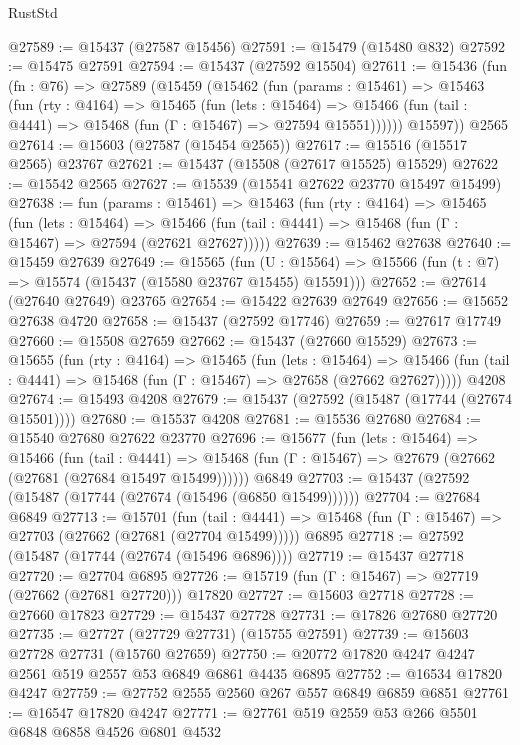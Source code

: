 \begin{lexlean}{RustStd}
\begin{coremodule}
@27589 := @15437 (@27587 @15456)
@27591 := @15479 (@15480 @832)
@27592 := @15475 @27591
@27594 := @15437 (@27592 @15504)
@27611 := @15436
    (fun (fn : @76) =>
    @27589
      (@15459
        (@15462
          (fun (params : @15461) =>
          @15463
            (fun (rty : @4164) =>
            @15465
              (fun (lets : @15464) =>
              @15466 (fun (tail : @4441) => @15468 (fun (Γ : @15467) => @27594 @15551))))))
        @15597))
    @2565
@27614 := @15603 (@27587 (@15454 @2565))
@27617 := @15516 (@15517 @2565) @23767
@27621 := @15437 (@15508 (@27617 @15525) @15529)
@27622 := @15542 @2565
@27627 := @15539 (@15541 @27622 @23770 @15497 @15499)
@27638 := fun (params : @15461) =>
  @15463
    (fun (rty : @4164) =>
    @15465
      (fun (lets : @15464) =>
      @15466 (fun (tail : @4441) => @15468 (fun (Γ : @15467) => @27594 (@27621 @27627)))))
@27639 := @15462 @27638
@27640 := @15459 @27639
@27649 := @15565
    (fun (U : @15564) => @15566 (fun (t : @7) => @15574 (@15437 (@15580 @23767 @15455) @15591)))
@27652 := @27614 (@27640 @27649) @23765
@27654 := @15422 @27639 @27649
@27656 := @15652 @27638 @4720
@27658 := @15437 (@27592 @17746)
@27659 := @27617 @17749
@27660 := @15508 @27659
@27662 := @15437 (@27660 @15529)
@27673 := @15655
    (fun (rty : @4164) =>
    @15465
      (fun (lets : @15464) =>
      @15466 (fun (tail : @4441) => @15468 (fun (Γ : @15467) => @27658 (@27662 @27627)))))
    @4208
@27674 := @15493 @4208
@27679 := @15437 (@27592 (@15487 (@17744 (@27674 @15501))))
@27680 := @15537 @4208
@27681 := @15536 @27680
@27684 := @15540 @27680 @27622 @23770
@27696 := @15677
    (fun (lets : @15464) =>
    @15466
      (fun (tail : @4441) =>
      @15468 (fun (Γ : @15467) => @27679 (@27662 (@27681 (@27684 @15497 @15499))))))
    @6849
@27703 := @15437 (@27592 (@15487 (@17744 (@27674 (@15496 (@6850 @15499))))))
@27704 := @27684 @6849
@27713 := @15701
    (fun (tail : @4441) => @15468 (fun (Γ : @15467) => @27703 (@27662 (@27681 (@27704 @15499)))))
    @6895
@27718 := @27592 (@15487 (@17744 (@27674 (@15496 @6896))))
@27719 := @15437 @27718
@27720 := @27704 @6895
@27726 := @15719 (fun (Γ : @15467) => @27719 (@27662 (@27681 @27720))) @17820
@27727 := @15603 @27718
@27728 := @27660 @17823
@27729 := @15437 @27728
@27731 := @17826 @27680 @27720
@27735 := @27727 (@27729 @27731) (@15755 @27591)
@27739 := @15603 @27728 @27731 (@15760 @27659)
@27750 := @20772 @17820 @4247 @4247 @2561 @519 @2557 @53 @6849 @6861 @4435 @6895
@27752 := @16534 @17820 @4247
@27759 := @27752 @2555 @2560 @267 @557 @6849 @6859 @6851
@27761 := @16547 @17820 @4247
@27771 := @27761 @519 @2559 @53 @266 @5501 @6848 @6858 @4526 @6801 @4532

\end{coremodule}
\end{lexlean}
